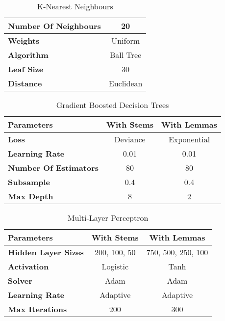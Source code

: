 \documentclass[a4paper, 12pt]{article}
\begin{document}
\begin{table}[h!]
  \caption{K-Nearest Neighbours}
  \begin{center}
	\begin{tabular}{l c}
	  \hline
	  \textbf{Number Of Neighbours} & 20 \\
	  \hline
	  \textbf{Weights}  & Uniform \\
	  \hline
	  \textbf{Algorithm} & Ball Tree \\
	  \hline
	  \textbf{Leaf Size} & 30 \\
	  \hline
	  \textbf{Distance} & Euclidean\\
	  \hline
	\end{tabular}
  \end{center}
\end{table}

\begin{table}[h!]
  \caption{Gradient Boosted Decision Trees}
  \begin{center}
	\begin{tabular}{l c c}
	  \hline
	  \textbf{Parameters}   & \textbf{With Stems} & \textbf{With Lemmas} \\
	  \hline
	  \textbf{Loss} & Deviance & Exponential \\
	  \hline
	  \textbf{Learning Rate} & 0.01 & 0.01 \\
	  \hline
	  \textbf{Number Of Estimators} & 80 & 80 \\
	  \hline
	  \textbf{Subsample} & 0.4 & 0.4 \\
	  \hline
	  \textbf{Max Depth} & 8 & 2 \\
	  \hline
	\end{tabular}
  \end{center}
\end{table}

\begin{table}[h!]
  \caption{Multi-Layer Perceptron}
  \begin{center}
	\begin{tabular}{l c c}
	  \hline
	  \textbf{Parameters}   & \textbf{With Stems} & \textbf{With Lemmas} \\
	  \hline
	  \textbf{Hidden Layer Sizes} & 200, 100, 50 & 750, 500, 250, 100 \\
	  \hline
	  \textbf{Activation} & Logistic & Tanh \\
	  \hline
	  \textbf{Solver} & Adam & Adam \\
	  \hline
	  \textbf{Learning Rate} & Adaptive & Adaptive \\
	  \hline
	  \textbf{Max Iterations} & 200 & 300 \\
	  \hline
	\end{tabular}
  \end{center}
\end{table}
\end{document}
